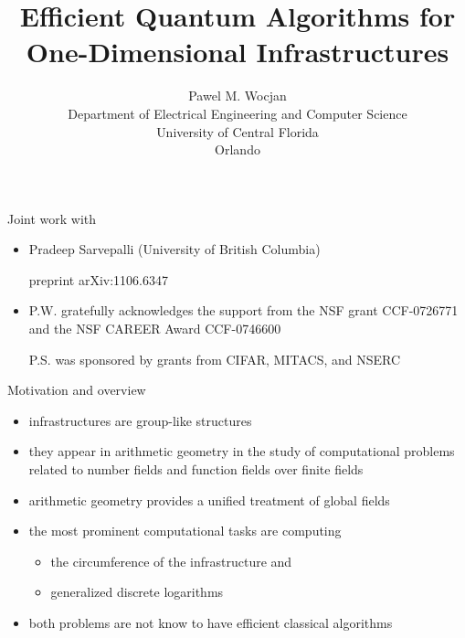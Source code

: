 \documentclass[slideColor]{prosper}
\title{Efficient Quantum Algorithms for One-Dimensional Infrastructures}
\author{Pawel M. Wocjan\\[1ex]Department of Electrical Engineering and Computer Science\\ University of Central Florida\\Orlando}
\renewcommand{\>}{\rangle}
\newcommand{\<}{\langle}
\begin{document}
\maketitle

\begin{slide}{Joint work with}
\begin{itemize}
\item Pradeep Sarvepalli (University of British Columbia) 

\bigskip
preprint arXiv:1106.6347
 
\bigskip\bigskip
\item P.W. gratefully acknowledges the support from the NSF grant CCF-0726771 and the NSF CAREER Award CCF-0746600

\bigskip
P.S. was sponsored by grants from CIFAR, MITACS, and NSERC
\end{itemize}
\end{slide}


\begin{slide}{Motivation and overview}
\vspace{-0.25cm}
\begin{itemize}
\item infrastructures are group-like structures

\medskip
\item they appear in arithmetic geometry in the study of computational problems related to
number fields and function fields over finite fields 

\medskip
\item arithmetic geometry provides a unified treatment of global fields 

\medskip
\item
the most prominent computational tasks are computing 

\begin{itemize}
\item the circumference of the infrastructure and

\medskip
\item generalized discrete logarithms
\end{itemize}

\medskip
\item
both problems are not know to have efficient classical algorithms
\end{itemize}

\end{slide}
\end{document}
